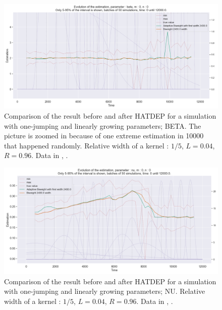 \begin{figure}
\centering
\includegraphics[width = 0.90 \textwidth]{../imag/chap3/3_bis/Q.png}
\caption{Comparison of the result before and after HATDEP for a simulation with one-jumping and linearly growing parameters; BETA. The picture is zoomed in because of one extreme estimation in 10000 that happened randomly. Relative width of a kernel : $1/5$, $L = 0.04$, $R = 0.96$. Data in \protect {}, \protect {}.}
\label{fig:second_estimate_3_beta}
\end{figure}

\begin{figure}
\centering
\includegraphics[width = 0.90 \textwidth]{../imag/chap3/3_bis/R.png}
\caption{Comparison of the result before and after HATDEP for a simulation with one-jumping and linearly growing parameters; NU. Relative width of a kernel : $1/5$, $L = 0.04$, $R = 0.96$. Data in \protect {}, \protect {}.}
\label{fig:second_estimate_3_nu}
\end{figure}




